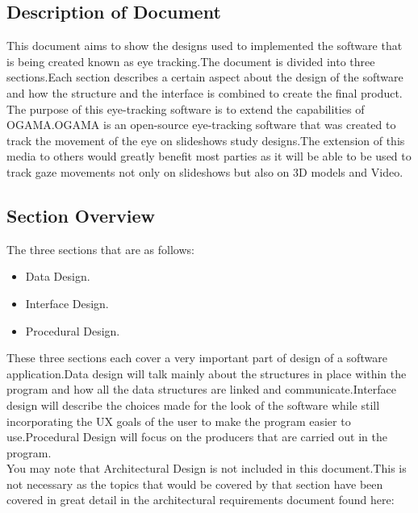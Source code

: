 \subsection{Description of Document}
This document aims to show the designs used to implemented the software that is being created known as eye tracking.The document is divided into three sections.Each section describes a certain aspect about the design of the software and how the structure and the interface is combined to create the final product.
The purpose of this eye-tracking software is to extend the capabilities of OGAMA.OGAMA is an open-source eye-tracking software that was created to track the movement of the eye on slideshows study designs.The extension of this media to others would greatly benefit most parties as it will be able to be used to track gaze movements not only on slideshows but also on 3D models and Video.
\subsection{Section Overview }
The three sections that are as follows:
\begin{itemize}
\item Data Design.
\item Interface Design.
\item Procedural Design.
\end{itemize}
These three sections each cover a very important part of design of a software application.Data design will talk mainly about the structures in place within the program and how all the data structures are linked and communicate.Interface design will describe the choices made for the look of the software while still incorporating the UX goals of the user to make the program easier to use.Procedural Design will focus on the producers that are carried out in the program.\\
You may note that Architectural Design is not included in this document.This is not necessary as the topics that would be covered by that section have been covered in great detail in the architectural requirements document found here: